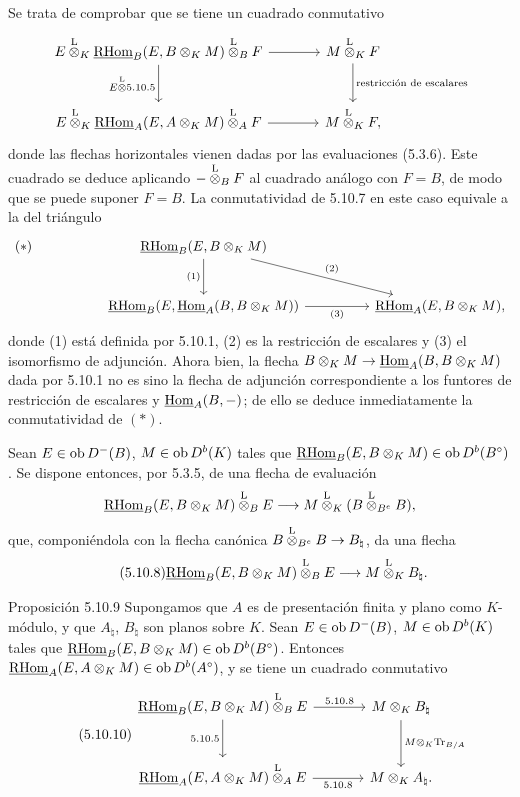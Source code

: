 Se trata de comprobar que se tiene un cuadrado conmutativo
\[
\begin{tikzcd}[column sep=large,row sep=large]
E\lten_K\uRHom_B(E,B\otimes_KM)\lten_BF \arrow[r] \arrow[d,"E\lten 5.10.5"'] & M\lten_KF \arrow[d,"\text{restricción de escalares}"]\\
E\lten_K\uRHom_A(E,A\otimes_KM)\lten_AF \arrow[r] & M\lten_KF,
\end{tikzcd}
\]
donde las flechas horizontales vienen dadas por las evaluaciones (5.3.6). Este cuadrado se deduce aplicando $-\overset{\mathrm L}{\otimes}_BF$ al cuadrado análogo con $F=B$, de modo que se puede suponer $F=B$. La conmutatividad de 5.10.7 en este caso equivale a la del triángulo
\[
\begin{tikzcd}[column sep=huge,row sep=large]
|[alias=star]| {(*)} & \uRHom_B(E,B\otimes_KM) \arrow[d,"(1)"'] \arrow[dr,"(2)"] & \\
& \uRHom_B(E,\uHom_A(B,B\otimes_KM)) \arrow[r,"(3)"'] & \uRHom_A(E,B\otimes_KM),
\end{tikzcd}
\]
donde (1) está definida por 5.10.1, (2) es la restricción de escalares y (3) el isomorfismo de adjunción. Ahora bien, la flecha $B\otimes_KM\to\underline{\operatorname{Hom}}_A(B,B\otimes_KM)$ dada por 5.10.1 no es sino la flecha de adjunción correspondiente a los funtores de restricción de escalares y $\underline{\operatorname{Hom}}_A(B,-)$; de ello se deduce inmediatamente la conmutatividad de $(*)$.

Sean $E\in\operatorname{ob} D^-(B)$, $M\in\operatorname{ob} D^b(K)$ tales que $\underline{\mathrm{RHom}}_B(E,B\otimes_KM)\in\operatorname{ob} D^b(B^\circ)$. Se dispone entonces, por 5.3.5, de una flecha de evaluación
\[
\underline{\mathrm{RHom}}_B(E,B\otimes_KM)\overset{\mathrm L}{\otimes}_BE\longrightarrow M\overset{\mathrm L}{\otimes}_K(B\overset{\mathrm L}{\otimes}_{B^e}B),
\]
que, componiéndola con la flecha canónica $B\overset{\mathrm L}{\otimes}_{B^e}B\to B_\natural$, da una flecha
\begin{equation}\tag{5.10.8}
\underline{\mathrm{RHom}}_B(E,B\otimes_KM)\overset{\mathrm L}{\otimes}_BE\longrightarrow M\overset{\mathrm L}{\otimes}_KB_\natural.
\end{equation}

\begin{statement}{Proposición 5.10.9}
Supongamos que $A$ es de presentación finita y plano como $K$-módulo, y que $A_\natural$, $B_\natural$ son planos sobre $K$. Sean $E\in\operatorname{ob} D^-(B)$, $M\in\operatorname{ob} D^b(K)$ tales que $\underline{\mathrm{RHom}}_B(E,B\otimes_KM)\in\operatorname{ob} D^b(B^\circ)$. Entonces $\underline{\mathrm{RHom}}_A(E,A\otimes_KM)\in\operatorname{ob} D^b(A^\circ)$, y se tiene un cuadrado conmutativo
\begin{equation}\tag{5.10.10}
\begin{tikzcd}[column sep=large,row sep=large]
\uRHom_B(E,B\otimes_KM)\lten_BE \arrow[r,"5.10.8"] \arrow[d,"5.10.5"'] & M\otimes_KB_\natural \arrow[d,"M\otimes_K\Tr_{B/A}"]\\
\uRHom_A(E,A\otimes_KM)\lten_AE \arrow[r,"5.10.8"'] & M\otimes_KA_\natural .
\end{tikzcd}
\end{equation}
\end{statement}

